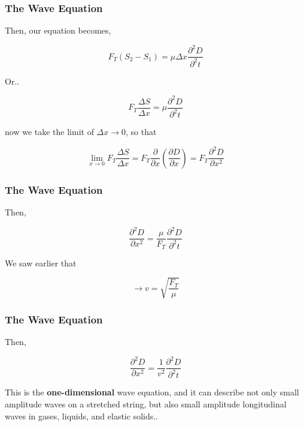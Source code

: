 \documentclass[]{beamer}
\begin{document}
\begin{frame}
\frametitle{The Wave Equation}


Then, our equation becomes,

\pause

\begin{equation}
F_T(S_2-S_1)=\mu \Delta x\frac{\partial^2D}{\partial^2 t}
\end{equation}

Or..

\pause

\begin{equation}
F_T\frac{\Delta S}{\Delta x}=\mu \frac{\partial^2D}{\partial^2 t}
\end{equation}

\pause

now we take the limit of $\Delta x \rightarrow 0$, so that
\pause

\begin{equation}
\lim_{x\to 0} F_T\frac{\Delta S}{\Delta x}=F_T\frac{\partial}{\partial x}\left(\frac{\partial D}{\partial x}\right)=F_T\frac{\partial^2D}{\partial x^2}
\end{equation}
\pause




  \end{frame}








\begin{frame}
\frametitle{The Wave Equation}

Then,

\pause

\begin{equation}
\frac{\partial^2D}{\partial x^2}=\frac{\mu}{F_T} \frac{\partial^2D}{\partial^2 t}
\end{equation}

We saw earlier that 
\pause

\begin{equation*}
\rightarrow v=\sqrt{\frac{F_T}{\mu}}
\end{equation*}


  \end{frame}




\begin{frame}
\frametitle{The Wave Equation}



Then,


\begin{equation}
\frac{\partial^2D}{\partial x^2}=\frac{1}{v^2} \frac{\partial^2D}{\partial^2 t}
\end{equation}

\pause

This is the \textbf{one-dimensional} wave equation, and it can describe not only small
amplitude waves on a stretched string, but also small amplitude longitudinal waves
 in gases, liquids, and elastic solids..

  \end{frame}
\end{document}
